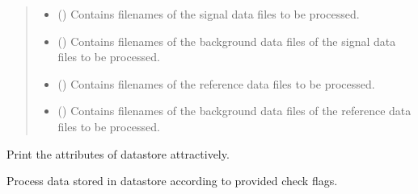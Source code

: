 \documentclass[a4paper,10pt,english]{sphinxmanual}
\begin{document}
\begin{fulllineitems}
\begin{fulllineitems}
\begin{quote}
\begin{description}
\begin{itemize}
\item {} 
\sphinxAtStartPar
{} () \textendash{} Contains filenames of the signal data files to be processed.

\item {} 
\sphinxAtStartPar
{} () \textendash{} Contains filenames of the background data files of the signal data files to be processed.

\item {} 
\sphinxAtStartPar
{} () \textendash{} Contains filenames of the reference data files to be processed.

\item {} 
\sphinxAtStartPar
{} () \textendash{} Contains filenames of the background data files of the reference data files to be processed.

\end{itemize}

\end{description}\end{quote}

\end{fulllineitems}


\begin{fulllineitems}
\label{\detokenize{sfgtools:sfgtools.SFGProcessTools.print_attributes}}
\sphinxAtStartPar
Print the attributes of datastore attractively.

\end{fulllineitems}


\begin{fulllineitems}
\label{\detokenize{sfgtools:sfgtools.SFGProcessTools.process_data}}
\sphinxAtStartPar
Process data stored in datastore according to provided check flags.


\end{fulllineitems}
\end{fulllineitems}
\end{document}
